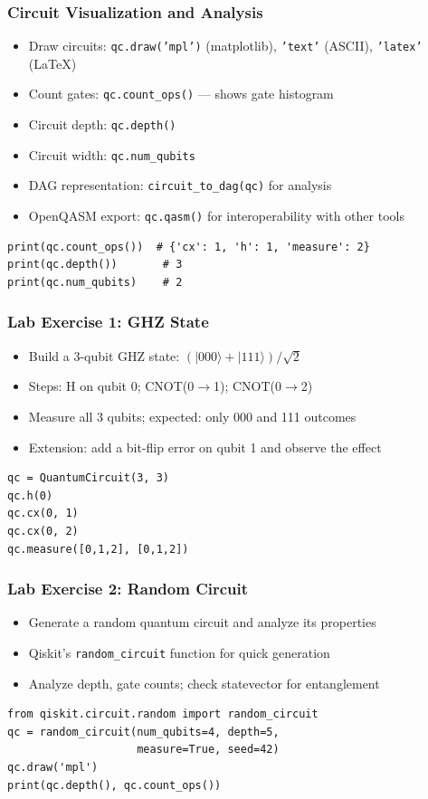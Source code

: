 \begin{frame}[fragile]\frametitle{Circuit Visualization and Analysis}
\begin{itemize}
\item Draw circuits: \texttt{qc.draw('mpl')} (matplotlib), \texttt{'text'} (ASCII), \texttt{'latex'} (LaTeX)
\item Count gates: \texttt{qc.count\_ops()} --- shows gate histogram
\item Circuit depth: \texttt{qc.depth()}
\item Circuit width: \texttt{qc.num\_qubits}
\item DAG representation: \texttt{circuit\_to\_dag(qc)} for analysis
\item OpenQASM export: \texttt{qc.qasm()} for interoperability with other tools
\end{itemize}
\begin{verbatim}
print(qc.count_ops())  # {'cx': 1, 'h': 1, 'measure': 2}
print(qc.depth())       # 3
print(qc.num_qubits)    # 2
\end{verbatim}
\end{frame}

\begin{frame}[fragile]\frametitle{Lab Exercise 1: GHZ State}
\begin{itemize}
\item Build a 3-qubit GHZ state: $(|000\rangle + |111\rangle)/\sqrt{2}$
\item Steps: H on qubit 0; CNOT(0$\to$1); CNOT(0$\to$2)
\item Measure all 3 qubits; expected: only 000 and 111 outcomes
\item Extension: add a bit-flip error on qubit 1 and observe the effect
\end{itemize}
\begin{verbatim}
qc = QuantumCircuit(3, 3)
qc.h(0)
qc.cx(0, 1)
qc.cx(0, 2)
qc.measure([0,1,2], [0,1,2])
\end{verbatim}
\end{frame}

\begin{frame}[fragile]\frametitle{Lab Exercise 2: Random Circuit}
\begin{itemize}
\item Generate a random quantum circuit and analyze its properties
\item Qiskit's \texttt{random\_circuit} function for quick generation
\item Analyze depth, gate counts; check statevector for entanglement
\end{itemize}
\begin{verbatim}
from qiskit.circuit.random import random_circuit
qc = random_circuit(num_qubits=4, depth=5,
                    measure=True, seed=42)
qc.draw('mpl')
print(qc.depth(), qc.count_ops())
\end{verbatim}
\end{frame}

